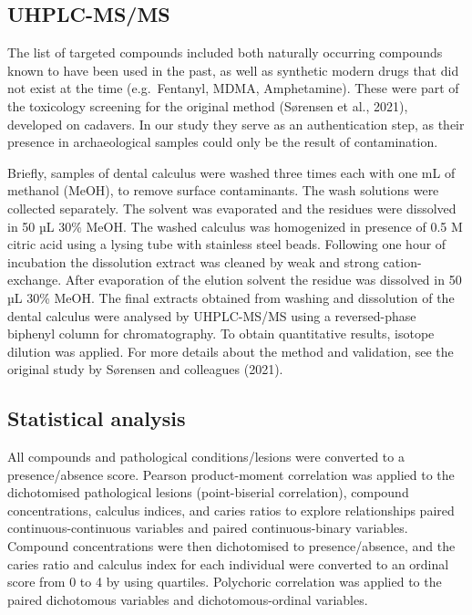 \documentclass[
]{article}
\begin{document}
\hypertarget{uhplc-msms}{%
\subsection{UHPLC-MS/MS}\label{uhplc-msms}}

The list of targeted compounds included both naturally occurring
compounds known to have been used in the past, as well as synthetic
modern drugs that did not exist at the time (e.g.~Fentanyl, MDMA,
Amphetamine). These were part of the toxicology screening for the
original method (Sørensen et al., 2021), developed on cadavers. In our
study they serve as an authentication step, as their presence in
archaeological samples could only be the result of contamination.

Briefly, samples of dental calculus were washed three times each with
one mL of methanol (MeOH), to remove surface contaminants. The wash
solutions were collected separately. The solvent was evaporated and the
residues were dissolved in 50 µL 30\% MeOH. The washed calculus was
homogenized in presence of 0.5 M citric acid using a lysing tube with
stainless steel beads. Following one hour of incubation the dissolution
extract was cleaned by weak and strong cation-exchange. After
evaporation of the elution solvent the residue was dissolved in 50 µL
30\% MeOH. The final extracts obtained from washing and dissolution of
the dental calculus were analysed by UHPLC-MS/MS using a reversed-phase
biphenyl column for chromatography. To obtain quantitative results,
isotope dilution was applied. For more details about the method and
validation, see the original study by Sørensen and colleagues (2021).

\hypertarget{statistical-analysis}{%
\subsection{Statistical analysis}\label{statistical-analysis}}

All compounds and pathological conditions/lesions were converted to a
presence/absence score. Pearson product-moment correlation was applied
to the dichotomised pathological lesions (point-biserial correlation),
compound concentrations, calculus indices, and caries ratios to explore
relationships paired continuous-continuous variables and paired
continuous-binary variables. Compound concentrations were then
dichotomised to presence/absence, and the caries ratio and calculus
index for each individual were converted to an ordinal score from 0 to 4
by using quartiles. Polychoric correlation was applied to the paired
dichotomous variables and dichotomous-ordinal variables.
\end{document}
